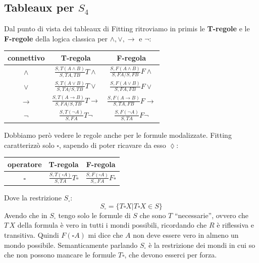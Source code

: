 \documentclass[a4paper,12pt, oneside]{book}
\begin{document}
\subsection{Tableaux per $S_4$}
Dal punto di vista dei tableaux di Fitting ritroviamo in primis le
\textbf{T-regole} e le \textbf{F-regole} della logica classica per
$\land,\lor,\to$ e $\neg$:
\begin{table}[H]
  \Large
  \centering
  \begin{tabular}{c||c|c}
    connettivo& T-regola& F-regola\\
    \hline
    \hline
    $\land$ & $\frac{S,T(A\land B)}{S,TA,TB}T\land$&
                        $\frac{S,F(A\land B)}{S,FA/S,FB}F\land$\\
    \hline
    $\lor$ & $\frac{S,T(A\lor B)}{S,TA/S,TB}T\lor$&
                        $\frac{S,F(A\lor B)}{S,FA,FB}F\lor$\\
    \hline
    $\to$ & $\frac{S,T(A\to B)}{S,FA/S,TB}T\to$&
                        $\frac{S,F(A\to B)}{S,TA,FB}F\to$\\
    \hline
    $\neg$ & $\frac{S,T(\neg A)}{S,FA}T\neg$&
                        $\frac{S,F(\neg A)}{S,TA}F\neg$\\
    \hline
  \end{tabular}
\end{table}
Dobbiamo però vedere le regole anche per le formule modalizzate. Fitting
caratterizzò solo $\square$, sapendo di poter ricavare da esso $\lozenge$:
\begin{table}[H]
  \Large
  \centering
  \begin{tabular}{c||c|c}
    operatore& T-regola& F-regola\\
    \hline
    \hline
    $\square$ & $\frac{S,T(\square A)}{S,TA}T\square$&
                        $\frac{S,F(\square A)}{S_\square,FA}F\square$\\
    \hline
  \end{tabular}
\end{table}
\noindent
Dove la restrizione $S_\square$:
\[S_\square=\{T\square X|T\square X\in S\}\]
Avendo che in $S_\square$ tengo solo le formule di $S$ che sono $T$
``necessarie'', ovvero che $T\,X$ della formula è vero in tutti i mondi
possibili, ricordando che $R$ è riflessiva e transitiva. Quindi $F(\square A)$
mi dice che $A$ non deve essere vero in almeno un mondo
possibile. Semanticamente parlando $S_\square$ è la restrizione dei mondi in cui
so che non possono mancare le formule $T\square$, che devono esserci per forza.
\end{document}
